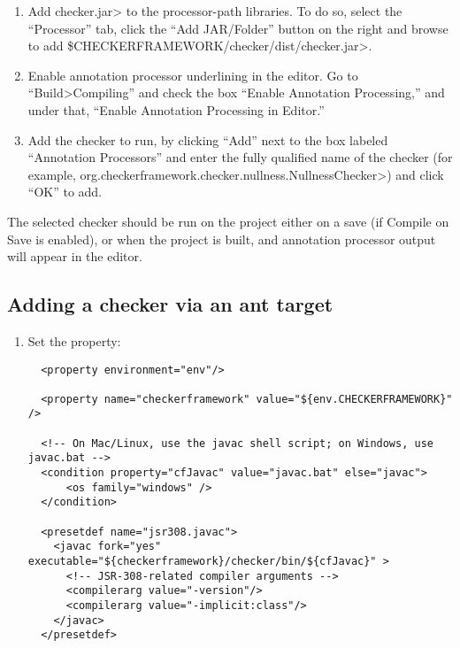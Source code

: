{\begin{enumerate}
\item
  Add \<checker.jar> to the processor-path libraries. To do so, select
  the ``Processor'' tab, click the ``Add JAR/Folder'' button on the
  right and browse to
  add \<\$CHECKERFRAMEWORK/checker/dist/checker.jar>.

\item
  Enable annotation processor underlining in the editor. Go to
  ``Build>Compiling'' and check the box ``Enable Annotation
  Processing,'' and under that, ``Enable Annotation Processing in
  Editor.''

\item
  Add the checker to run, by clicking ``Add'' next to the box labeled
  ``Annotation Processors'' and enter the fully qualified name of the
  checker (for
  example, \<org.checkerframework.checker.nullness.NullnessChecker>)
  and click ``OK'' to add.
\end{enumerate}

The selected checker should be run on the project either on a save (if
Compile on Save is enabled), or when the project is built, and
annotation processor output will appear in the editor.


\subsection {Adding a checker via an ant target\label{netbeans-ant-target}}

\begin{enumerate}
\item
Set the  property:

\begin{smaller}
\begin{Verbatim}
  <property environment="env"/>

  <property name="checkerframework" value="${env.CHECKERFRAMEWORK}" />

  <!-- On Mac/Linux, use the javac shell script; on Windows, use javac.bat -->
  <condition property="cfJavac" value="javac.bat" else="javac">
      <os family="windows" />
  </condition>

  <presetdef name="jsr308.javac">
    <javac fork="yes" executable="${checkerframework}/checker/bin/${cfJavac}" >
      <!-- JSR-308-related compiler arguments -->
      <compilerarg value="-version"/>
      <compilerarg value="-implicit:class"/>
    </javac>
  </presetdef>
\end{Verbatim}
\end{smaller}


\end{enumerate}}

